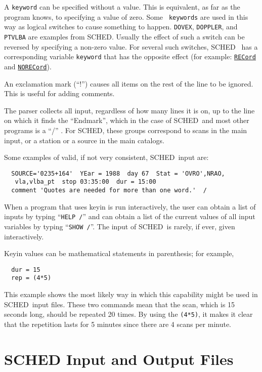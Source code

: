 \documentclass{report}
\newcommand{\sched}{{\sc SCHED}}
\newcommand{\schedb}{{\sc SCHED~}}
\begin{document}
A {\tt keyword} can be specified without a value. This is equivalent,
as far as the program knows, to specifying a value of zero. Some {\tt
keywords} are used in this way as logical switches to cause something
to happen. {\tt DOVEX}, {\tt DOPPLER}, and {\tt PTVLBA} are examples from
\sched. Usually the effect of such a switch can be reversed by
specifying a non-zero value.  For several such switches, \schedb
has a corresponding variable {\tt keyword} that has the opposite effect
(for example: 
{\hyperref[MP:RECORD]{{\tt RECord}}} and 
{\hyperref[MP:RECORD]{{\tt NORECord}}}).

An exclamation mark (``!'') causes all items on the rest of the line
to be ignored. This is useful for adding comments.

The parser collects all input, regardless of how many lines it is on,
up to the line on which it finds the ``Endmark'', which in the case of
\schedb and most other programs is a ``/'' .  For \sched, these
groups correspond to scans in the main input, or a station or a source
in the main catalogs.

Some examples of valid, if not very consistent, \schedb input are:

\begin{verbatim}
  SOURCE='0235+164'  YEar = 1988  day 67  Stat = 'OVRO',NRAO,
   vla,vlba_pt  stop 03:35:00  dur = 15:00
  comment 'Quotes are needed for more than one word.'  /
\end{verbatim}

When a program that uses keyin is run interactively, the user can
obtain a list of inputs by typing ``{\tt HELP /}'' and can obtain a list of
the current values of all input variables by typing ``{\tt SHOW /}''.
The input of \schedb is rarely, if ever, given interactively.

Keyin values can be mathematical statements in parenthesis; for
example,
\begin{verbatim}
  dur = 15
  rep = (4*5)
\end{verbatim}
This example shows the most likely way in which this capability might
be used in \schedb input files.  These two commands mean that
the scan, which is 15 seconds long, should be repeated 20 times.
By using the {\tt (4*5)}, it makes it clear that the repetition
lasts for 5 minutes since there are 4 scans per minute.

\section{\label{SEC:FILES} SCHED Input and Output Files}
\end{document}
